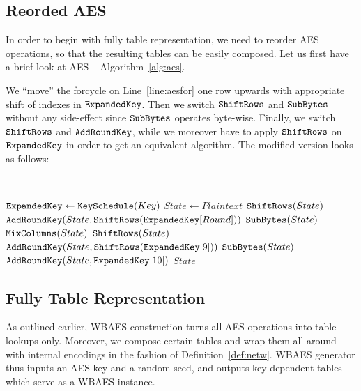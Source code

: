 
\subsection{Reorded AES}

In order to begin with fully table representation, we need to reorder AES operations, so that the resulting tables can be easily composed. Let us first have a brief look at AES -- Algorithm~\ref{alg:aes}.

We ``move'' the forcycle on Line~\ref{line:aesfor} one row upwards with appropriate shift of indexes in $\texttt{ExpandedKey}$. Then we switch $\texttt{ShiftRows}$ and $\texttt{SubBytes}$ without any side-effect since $\texttt{SubBytes}$ operates byte-wise. Finally, we switch $\texttt{ShiftRows}$ and $\texttt{AddRoundKey}$, while we moreover have to apply $\texttt{ShiftRows}$ on $\texttt{ExpandedKey}$ in order to get an equivalent algorithm. The modified version looks as follows:
\begin{alg}
\label{alg:reordaes}
	~
	\begin{algorithmic}[1]
			\State $\texttt{ExpandedKey} \gets \texttt{KeySchedule}(Key)$
			\State $State \gets Plaintext$
				\State $\texttt{ShiftRows}(State)$
				\State $\texttt{AddRoundKey}(State, \texttt{ShiftRows}(\texttt{ExpandedKey}[Round]))$
				\State $\texttt{SubBytes}(State)$
				\State $\texttt{MixColumns}(State)$
			\EndFor
			\State $\texttt{ShiftRows}(State)$
			\State $\texttt{AddRoundKey}(State, \texttt{ShiftRows}(\texttt{ExpandedKey}[9]))$
			\State $\texttt{SubBytes}(State)$
			\State $\texttt{AddRoundKey}(State, \texttt{ExpandedKey}[10])$
			\State\Return $State$
		\EndFunction
	\end{algorithmic}
\end{alg}



\subsection{Fully Table Representation}

As outlined earlier, WBAES construction turns all AES operations into table lookups only. Moreover, we compose certain tables and wrap them all around with internal encodings in the fashion of Definition~\ref{def:netw}. WBAES generator thus inputs an AES key and a random seed, and outputs key-dependent tables which serve as a WBAES instance.

